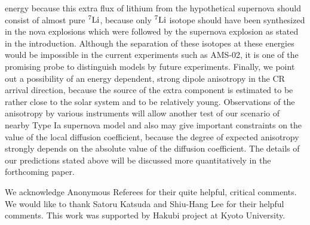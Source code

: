 \documentclass[twocolumn,showpacs,amsmath,amssymb]{revtex4-1}
\begin{document}
energy because this extra flux of lithium from the hypothetical supernova should consist of almost pure $^7{\rm Li}$, because only $^7{\rm Li}$ isotope should have been synthesized in the nova explosions which were followed by the supernova explosion as stated in the introduction.  Although the separation of these isotopes at these energies would be impossible in the current experiments such as AMS-02, it is one of the promising probe to distinguish models by future experiments.  Finally, we point out a possibility of an energy dependent, strong dipole anisotropy in the CR arrival direction, because the source of the extra component is estimated to be rather close to the solar system and to be relatively young.  Observations of the anisotropy by various instruments will allow another test of our scenario of nearby Type Ia supernova model and also may give important constraints on the value of the local diffusion coefficient, because the degree of expected anisotropy strongly depends on the absolute value of the diffusion coefficient.  The details of our predictions stated above will be discussed more quantitatively in the forthcoming paper.
\begin{acknowledgements}
We acknowledge Anonymous Referees for their quite helpful, critical comments.  We would like to thank Satoru Katsuda and Shiu-Hang Lee for their helpful comments.  This work was supported by Hakubi project at Kyoto University.
\end{acknowledgements}
\end{document}

